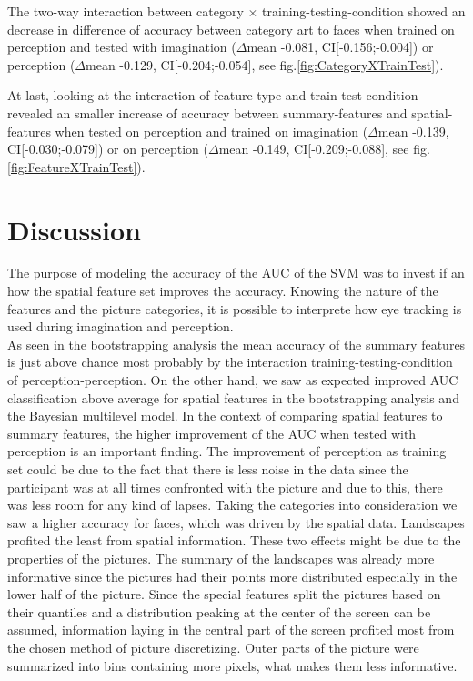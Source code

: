 \documentclass[a4paper,man,natbib,floatsintext]{apa6}
\begin{document}
The two-way interaction between category $\times$ training-testing-condition showed an decrease in difference of accuracy between category art to faces when trained on perception and tested with imagination ($\Delta$mean -0.081, CI[-0.156;-0.004]) or perception ($\Delta$mean -0.129, CI[-0.204;-0.054], see fig.\ref{fig:CategoryXTrainTest}). 

At last, looking at the interaction of feature-type and train-test-condition revealed an smaller increase of accuracy between summary-features and spatial-features when tested on perception and trained on imagination ($\Delta$mean -0.139, CI[-0.030;-0.079]) or on perception ($\Delta$mean -0.149, CI[-0.209;-0.088], see fig.\ref{fig:FeatureXTrainTest}).


\section{Discussion}
The purpose of modeling the accuracy of the AUC of the SVM was to invest if an how the spatial feature set improves the accuracy. Knowing the nature of the features and the picture categories, it is possible to interprete how eye tracking is used during imagination and perception. \\
As seen in the bootstrapping analysis the mean accuracy of the summary features is just above chance most probably by the interaction training-testing-condition of perception-perception.
On the other hand, we saw as expected improved AUC classification above average for spatial features in the bootstrapping analysis and the Bayesian multilevel model.
In the context of comparing spatial features to summary features, the higher improvement of the AUC when tested with perception is an important finding. The improvement of perception as training set could be due to the fact that there is less noise in the data since the participant was at all times confronted with the picture and due to this, there was less room for any kind of lapses.
Taking the categories into consideration we saw a higher accuracy for faces, which was driven by the spatial data. Landscapes profited the least from spatial information. These two effects might be due to the properties of the pictures. The summary of the landscapes was already more informative since the pictures had their points more distributed especially in the lower half of the picture. Since the special features split the pictures based on their quantiles and a distribution peaking at the center of the screen can be assumed, information laying in the central part of the screen profited most from the chosen method of picture discretizing. Outer parts of the picture were summarized into bins containing more pixels, what makes them less informative. 
\end{document}
